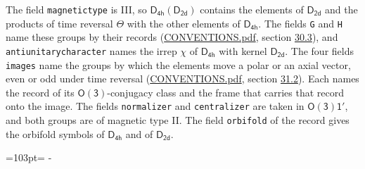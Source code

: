 \documentclass[10pt,a4paper]{article}
\newcommand{\needspace}[1]{\par\penalty-100\begingroup\dimen0=#1\relax\dimen2=\pagegoal
  \advance\dimen2-\pagetotal\ifdim\dimen0>\dimen2\relax\ifdim\dimen2>0pt\vfil\break\fi\fi
  \endgroup}
\numberwithin{equation}{section}
\newcommand{\grp}[1]{\mathsf{#1}}
\begin{document}
The field \texttt{magnetictype} is III, so $\grp{D_{4h}}(\grp{D_{2d}})$ contains the elements of $\grp{D_{2d}}$ and the products of time reversal $\varTheta$ with the other elements of $\grp{D_{4h}}$. The fields \texttt{G} and \texttt{H} name these groups by their records (\href{../../CONVENTIONS.pdf}{CONVENTIONS.pdf}, section \href{../../CONVENTIONS.pdf\#conv.30.3}{30.3}), and \texttt{antiunitarycharacter} names the irrep $\chi$ of $\grp{D_{4h}}$ with kernel $\grp{D_{2d}}$. The four fields \texttt{images} name the groups by which the elements move a polar or an axial vector, even or odd under time reversal (\href{../../CONVENTIONS.pdf}{CONVENTIONS.pdf}, section \href{../../CONVENTIONS.pdf\#conv.31.2}{31.2}). Each names the record of its $\grp{O(3)}$-conjugacy class and the frame that carries that record onto the image. The fields \texttt{normalizer} and \texttt{centralizer} are taken in $\grp{O(3)1'}$, and both groups are of magnetic type II. The field \texttt{orbifold} of the record gives the orbifold symbols of $\grp{D_{4h}}$ and of $\grp{D_{2d}}$.
\needspace{103pt}
\end{document}

